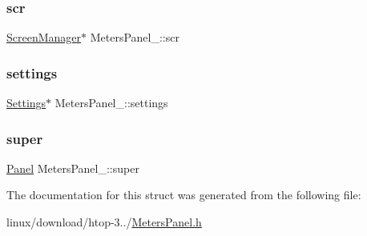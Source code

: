 \subsubsection{\texorpdfstring{scr}{scr}}
{\footnotesize\ttfamily \hyperlink{ScreenManager_8h_a798c9c69dc8024a4c6829982bf94dddd}{Screen\+Manager}$\ast$ Meters\+Panel\+\_\+\+::scr}

\mbox{\label{structMetersPanel___a0586779c31d030c47ac8693cc9cf93a0}} 
\subsubsection{\texorpdfstring{settings}{settings}}
{\footnotesize\ttfamily \hyperlink{Settings_8h_ad97e5960b63f21c02bf5e0e43c0ef002}{Settings}$\ast$ Meters\+Panel\+\_\+\+::settings}

\mbox{\label{structMetersPanel___a5e17d186eb42e06f29d3cb2bee137638}} 
\subsubsection{\texorpdfstring{super}{super}}
{\footnotesize\ttfamily \hyperlink{Panel_8h_a034d4c16521db412dc7a1e8536d16fae}{Panel} Meters\+Panel\+\_\+\+::super}



The documentation for this struct was generated from the following file\+:\begin{DoxyCompactItemize}
\item 
linux/download/htop-\/3../\hyperlink{MetersPanel_8h}{Meters\+Panel.\+h}\end{DoxyCompactItemize}
